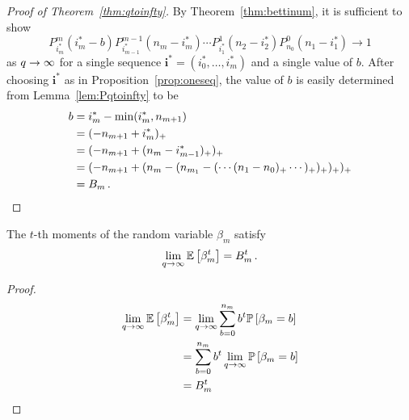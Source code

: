 \begin{proof}[Proof of Theorem~\ref{thm:qtoinfty}]
  By Theorem~\ref{thm:bettinum}, it is sufficient to show
  \[
    P^m_{i_m^\ast}(i_m^\ast-b) P_{i^\ast_{m-1}}^{m-1}\left(n_{m} -i_m^\ast\right) \cdots
    P_{i_1^\ast}^1\left(n_2 - i_2^\ast\right) P_{n_0}^0 \left(n_1 - i_1^\ast\right) \to 1 
  \]
  as $q \rightarrow \infty$ for a single sequence $\mathbf{i}^\ast=(i_0^\ast, \ldots,
  i_m^\ast)$ and a single
  value of $b$. After choosing $\mathbf{i}^\ast$ as in Proposition~\ref{prop:oneseq},
  the value of $b$ is easily determined from Lemma~\ref{lem:Pqtoinfty} to be
	\begin{align*}
	b 	&= i_m^\ast - \min(i_m^\ast, n_{m+1})\\
		&= (-n_{m+1} + i_m^\ast)_+\\
		&= (-n_{m+1} + (n_m -i_{m-1}^\ast)_+)_+\\
		&= (-n_{m+1} + (n_m - (n_{m_1} - (\cdots (n_1 - n_0)_+ \cdots)_+)_+)_+ )_+\\
        &= B_m \, . \qedhere
	\end{align*}
\end{proof}



\begin{corollary}
  The $t$-th moments of the random variable $\beta_m$ satisfy
  \[
    \lim_{q \rightarrow \infty} \mathbb{E}\left[\beta_m^t \right] = B_m^t \, .
  \]
\end{corollary}
\begin{proof}
	\begin{align*}
	\lim_{q \rightarrow \infty} \mathbb{E}\left[\beta_m^t \right]
	&= \lim_{q \rightarrow \infty} \sum_{b=0}^{n_m} b^t \mathbb{P}\left[\beta_m = b \right]\\
	&= \sum_{b=0}^{n_m} b^t \lim_{q \rightarrow \infty} \mathbb{P}\left[\beta_m = b \right]\\
	&= B_m^t
	\end{align*}
\end{proof}


